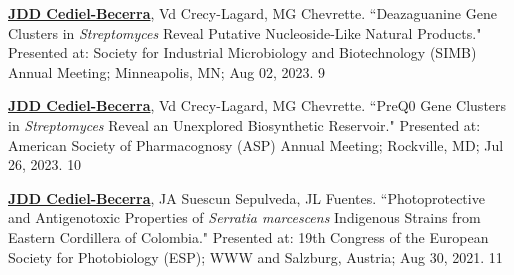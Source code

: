 \begin{cvpubs}
\cvpub
{\textbf{\underline{JDD Cediel-Becerra}}, Vd Crecy-Lagard, MG Chevrette. ``Deazaguanine Gene Clusters in \textit{Streptomyces} Reveal Putative Nucleoside-Like Natural Products." Presented at: Society for Industrial Microbiology and Biotechnology (SIMB) Annual Meeting; Minneapolis, MN; Aug 02, 2023.}
{9}

\cvpub
{\textbf{\underline{JDD Cediel-Becerra}}, Vd Crecy-Lagard, MG Chevrette. ``PreQ0 Gene Clusters in \textit{Streptomyces} Reveal an Unexplored Biosynthetic Reservoir." Presented at: American Society of Pharmacognosy (ASP) Annual Meeting; Rockville, MD; Jul 26, 2023.}
{10}
\end{cvpubs} \begin{cvpubs}

\cvpub
{\textbf{\underline{JDD Cediel-Becerra}}, JA Suescun Sepulveda, JL Fuentes. ``Photoprotective and Antigenotoxic Properties of \textit{Serratia marcescens} Indigenous Strains from Eastern Cordillera of Colombia." Presented at: 19th Congress of the European Society for Photobiology (ESP); WWW and Salzburg, Austria; Aug 30, 2021.}
{11}






\end{cvpubs}